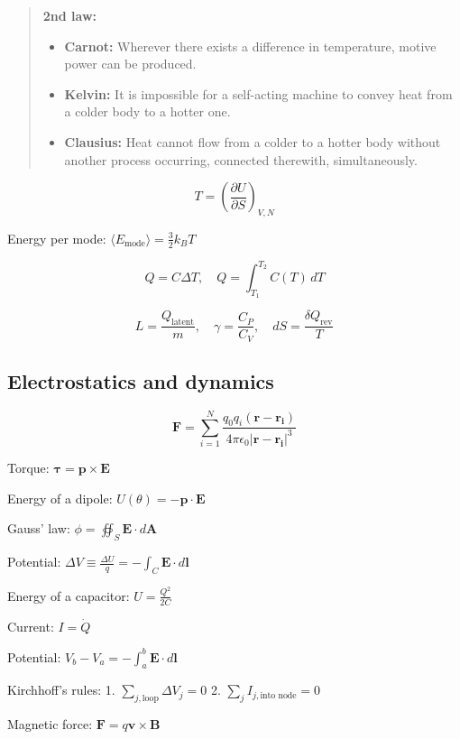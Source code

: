 \documentclass[12pt,a4paper]{article}
\begin{document}
\begin{quote}
\textbf{2nd law:} 
\begin{itemize}
	\item \textbf{Carnot:} Wherever there exists a difference in temperature, motive power can be produced.
	\item \textbf{Kelvin:} It is impossible for a self-acting machine to convey heat from a colder body to a hotter one.
	\item \textbf{Clausius:} Heat cannot flow from a colder to a hotter body without another process occurring, connected therewith, simultaneously.
\end{itemize}
\end{quote}
\[
T = \left( \frac{\partial U}{\partial S} \right)_{V, N}
\]

Energy per mode: \( \langle E_\text{mode} \rangle = \frac{3}{2} k_B T \)

\[
Q = C \Delta T, \quad Q = \int_{T_1}^{T_2} C(T) \, dT
\]

\[
L = \frac{Q_\text{latent}}{m}, \quad \gamma = \frac{C_P}{C_V}, \quad dS = \frac{\delta Q_\text{rev}}{T}
\]

	\subsection*{Electrostatics and dynamics}
	\setlength{\parskip}{.8em} %
	
	\[
	\mathbf{F} = \sum_{i=1}^{N} \frac{q_0 q_i (\mathbf{r}-\mathbf{r_i})}{4\pi \epsilon_0 |\mathbf{r}-\mathbf{r_i}|^3}
	\]
	
	Torque: \( \mathbf{\tau} = \mathbf{p} \times \mathbf{E} \)
	
	Energy of a dipole: \( U(\theta) = -\mathbf{p} \cdot \mathbf{E} \)
	
	Gauss' law: \( \phi = \oiint_{S} \mathbf{E} \cdot d\mathbf{A} \)
	
	Potential: \( \Delta V \equiv \frac{\Delta U}{q} = - \int_{C} \mathbf{E} \cdot d\mathbf{l} \)
	
	Energy of a capacitor: \( U = \frac{Q^2}{2C} \)
	
	Current: \( I = \dot{Q} \)
	
	Potential: \( V_b - V_a = -\int_{a}^{b} \mathbf{E} \cdot d\mathbf{l} \)
	
	Kirchhoff's rules:
	1. \( \sum_{j, \text{loop}} \Delta V_j = 0 \)
	2. \( \sum_{j} I_{j, \text{into node}} = 0 \)
	
	Magnetic force: \( \mathbf{F} = q\mathbf{v} \times \mathbf{B} \)
	
\end{document}
